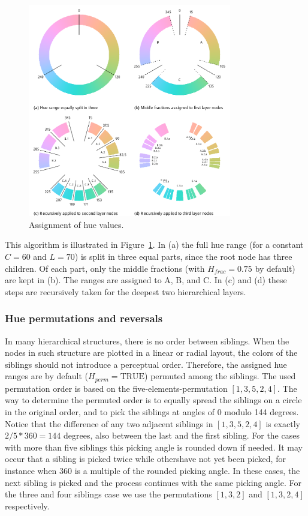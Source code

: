 \documentclass[journal]{vgtc}                %
\begin{document}
\begin{figure}[htb]
  \centering
  \includegraphics[width=3.5in]{hcl_method2.pdf}
  \caption{Assignment of hue values.}\label{fig:wheel}
\end{figure}

This algorithm is illustrated in Figure~\ref{fig:wheel}. In (a) the full hue range (for a constant $C=60$ and $L=70$)  is split in three equal parts, since the root node has three children. Of each part, only the middle fractions (with $H_{frac}=0.75$ by default) are kept in (b). The ranges are assigned to A, B, and C. In (c) and (d) these steps are recursively taken for the deepest two hierarchical layers.


\subsubsection{Hue permutations and reversals}

In many hierarchical structures, there is no order between siblings. When the nodes in such structure are plotted in a linear or radial layout, the colors of the siblings should not introduce a perceptual order. Therefore, the assigned hue ranges are by default ($H_{perm}=\mbox{TRUE}$) permuted among the siblings. The used permutation order is based on the five-elements-permutation $[1, 3, 5, 2, 4]$. The way to determine the permuted order is to equally spread the siblings on a circle in the original order, and to pick the siblings at angles of 0 modulo 144 degrees. Notice that the difference of any two adjacent siblings in $[1, 3, 5, 2, 4]$ is exactly $2/5 * 360=144$ degrees, also between the last and the first sibling. For the cases with more than five siblings this picking angle is rounded down if needed. It may occur that a sibling is picked twice while othershave not yet been picked, for instance when 360 is a multiple of the rounded picking angle. In these cases, the next sibling is picked and the process continues with the same picking angle. For the three and four siblings case we use the permutations $[1, 3, 2]$ and $[1, 3, 2, 4]$ respectively. 
\end{document}
